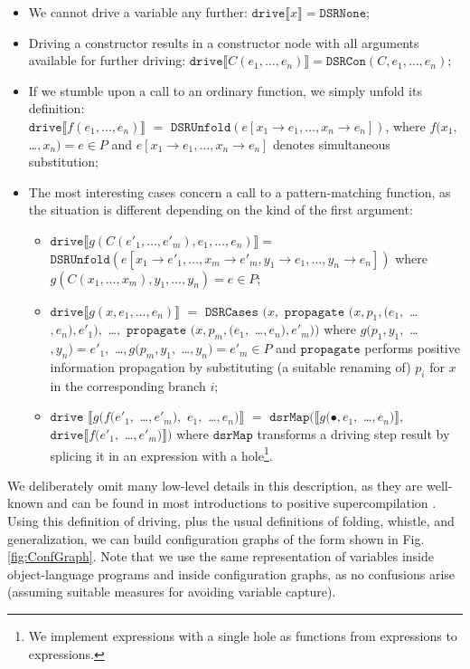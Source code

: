 \documentclass[submission,copyright,creativecommons]{eptcs}
\begin{document}
\begin{itemize}
  \item We cannot drive a variable any further: $\mathtt{drive} \llbracket x \rrbracket = \mathtt{DSRNone}$;
  \item Driving a constructor results in a constructor node with all arguments available for
    further driving: $\mathtt{drive} \llbracket C(e_1, \ldots, e_n) \rrbracket = \mathtt{DSRCon}(C, e_1, \ldots, e_n)$;
  \item If we stumble upon a call to an ordinary function, we simply unfold its definition: \\
    $\mathtt{drive} \llbracket f(e_1, \ldots, e_n) \rrbracket$ $=$ $\mathtt{DSRUnfold}(e [ x_1\rightarrow e_1, \ldots, x_n\rightarrow e_n ])$,
    where $f(x_1,$ \ldots$, x_n) = e \in P$ and $e [ x_1\rightarrow e_1, \ldots, x_n\rightarrow e_n ] $
    denotes simultaneous substitution;
  \item The most interesting cases concern a call to a pattern-matching function, as the situation is
    different depending on the kind of the first argument:
    \begin{itemize}
      \item $\mathtt{drive} \llbracket g(C(e'_1, \ldots, e'_m), e_1, \ldots, e_n) \rrbracket =$
        $\mathtt{DSRUnfold}(e [ x_1\rightarrow e'_1, \ldots, x_m\rightarrow e'_m, y_1 \rightarrow e_1, \ldots, y_n \rightarrow e_n ])$
        where $g(C(x_1, \ldots, x_m), y_1, \ldots, y_n) = e \in P$;
      \item $\mathtt{drive} \llbracket g(x, e_1, \ldots, e_n) \rrbracket$ $=$
        $\mathtt{DSRCases}$ $(x,$ $\mathtt{propagate}$ $(x, p_1, (e_1,$ \ldots$, e_n), e'_1),$ \ldots$,$ 
          $\mathtt{propagate}$ $(x, p_m, (e_1,$ \ldots$, e_n), e'_m))$
        where $g(p_1, y_1,$ \ldots$, y_n) = e'_1,$ \ldots$, g(p_m, y_1,$ \ldots$, y_n) = e'_m \in P$
        and $\mathtt{propagate}$ performs positive information propagation by substituting (a suitable renaming of) $p_i$ for $x$ 
        in the corresponding branch $i$;
      \item $\mathtt{drive}$ $\llbracket g(f(e'_1,$ \ldots$, e'_m),$ $e_1,$ \ldots$, e_n) \rrbracket$ $=$
        $\mathtt{dsrMap}$$(\llbracket g(\bullet, e_1,$ \ldots$, e_n) \rrbracket,$ $\mathtt{drive} \llbracket f(e'_1,$ \ldots$, e'_m) \rrbracket)$
        where $\mathtt{dsrMap}$ transforms a driving step result by splicing it in an expression with a hole\footnote{
        We implement expressions with a single hole as functions from expressions to expressions.}.
    \end{itemize}
\end{itemize}
We deliberately omit many low-level details in this description, as they are well-known and can be found
in most introductions to positive supercompilation \cite{Sorensen1994TurchinSupercompiler,sorm98b,TMR/SCP2014}.
Using this definition of driving, plus the usual definitions of folding, whistle, and generalization, 
we can build configuration graphs of the form shown in Fig. \ref{fig:ConfGraph}.
Note that we use the same representation of variables inside object-language programs and inside configuration graphs,
as no confusions arise (assuming suitable measures for avoiding variable capture).
\end{document}
